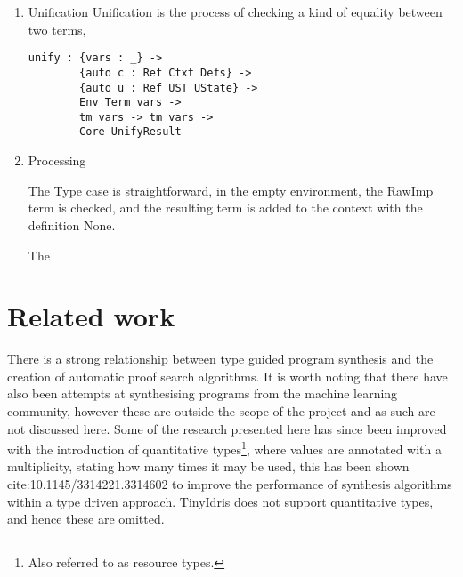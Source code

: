 \documentclass[a4paper]{article}
\begin{document}
\begin{enumerate}
\item Unification
\label{sec:org2b8a226}
Unification is the process of checking a kind of equality between two terms, 

\begin{center}
\begin{verbatim}
unify : {vars : _} ->
		{auto c : Ref Ctxt Defs} ->
		{auto u : Ref UST UState} ->
		Env Term vars ->
		tm vars -> tm vars ->
		Core UnifyResult
\end{verbatim}
\end{center}


\item Processing
\label{sec:org2921b30}

The Type case is straightforward, in the empty environment, the RawImp 
term is checked, and the resulting term is added to the context with 
the definition None. 

The
\end{enumerate}

\section{Related work}
\label{sec:org5651a39}
There is a strong relationship between type guided program synthesis and the creation of automatic proof search algorithms.
It is worth noting that there have also been attempts at synthesising programs from the machine learning community, however these
are outside the scope of the project and as such are not discussed here. Some of the research presented here has since been 
improved with the introduction of quantitative types\footnote{Also referred to as resource types.}, where values are annotated with a multiplicity, stating how many 
times it may be used, this has been shown cite:10.1145/3314221.3314602 to improve the performance of synthesis algorithms within
a type driven approach. TinyIdris does not support quantitative types, and hence these are omitted.
\end{document}
